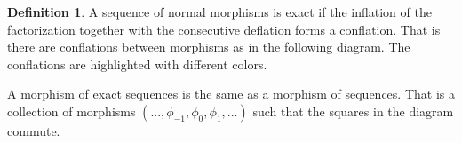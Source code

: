 \documentclass[11pt]{article}
\theoremstyle{definition}
\newtheorem{definition}{Definition}[section]
\theoremstyle{remark}
\begin{document}
            \begin{definition}
                A sequence of normal morphisms is exact if the inflation of the factorization together with the consecutive deflation forms a conflation. That is there are conflations between morphisms as in the following diagram. The conflations are highlighted with different colors.

                \begin{center}
                \end{center}

                A morphism of exact sequences is the same as a morphism of sequences. That is a collection of morphisms $(...,\phi_{-1},\phi_0,\phi_1,...)$ such that the squares in the diagram commute.

                \begin{center}
                \end{center}
            \end{definition}
\end{document}
